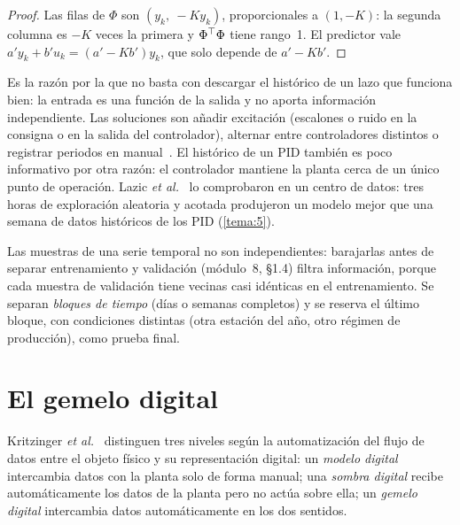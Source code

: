 \begin{proof}
Las filas de $\Phi$ son $(y_k,\ -Ky_k)$, proporcionales a $(1,-K)$: la segunda columna es $-K$ veces la primera y $\Phi^{\top}\Phi$ tiene rango~1. El predictor vale $a'y_k+b'u_k=(a'-Kb')y_k$, que solo depende de $a'-Kb'$.
\end{proof}

Es la razón por la que no basta con descargar el histórico de un lazo que funciona bien: la entrada es una función de la salida y no aporta información independiente. Las soluciones son añadir excitación (escalones o ruido en la consigna o en la salida del controlador), alternar entre controladores distintos o registrar periodos en manual~\cite{ljung}. El histórico de un PID también es poco informativo por otra razón: el controlador mantiene la planta cerca de un único punto de operación. Lazic \emph{et al.}~\cite{lazic} lo comprobaron en un centro de datos: tres horas de exploración aleatoria y acotada produjeron un modelo mejor que una semana de datos históricos de los PID (\cref{tema:5}).

\begin{observacion}\label{obs:particion}
Las muestras de una serie temporal no son independientes: barajarlas antes de separar entrenamiento y validación (módulo~8, §1.4) filtra información, porque cada muestra de validación tiene vecinas casi idénticas en el entrenamiento. Se separan \emph{bloques de tiempo} (días o semanas completos) y se reserva el último bloque, con condiciones distintas (otra estación del año, otro régimen de producción), como prueba final.
\end{observacion}

\section{El gemelo digital}

\begin{definicion}\label{def:gemelo}
Kritzinger \emph{et al.}~\cite{kritzinger} distinguen tres niveles según la automatización del flujo de datos entre el objeto físico y su representación digital: un \emph{modelo digital} intercambia datos con la planta solo de forma manual; una \emph{sombra digital} recibe automáticamente los datos de la planta pero no actúa sobre ella; un \emph{gemelo digital} intercambia datos automáticamente en los dos sentidos.
\end{definicion}

